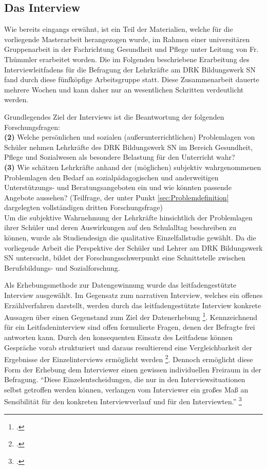 \subsection{Das Interview}
\label{sec:DasInterview}

Wie bereits eingangs erwähnt, ist ein Teil der Materialien, welche für die vorliegende Masterarbeit herangezogen wurde, im Rahmen einer universitären Gruppenarbeit in der Fachrichtung Gesundheit und Pflege unter Leitung von Fr. Thümmler erarbeitet worden. Die im Folgenden beschriebene Erarbeitung des Interviewleitfadens für die Befragung der Lehrkräfte am DRK Bildungswerk SN fand durch diese fünfköpfige Arbeitsgruppe statt. Diese Zusammenarbeit dauerte mehrere Wochen und kann daher nur an wesentlichen Schritten verdeutlicht werden.

\noindent
Grundlegendes Ziel der Interviews ist die Beantwortung der folgenden Forschungsfragen:\\

\noindent
\textbf{(2)} Welche persönlichen und sozialen (außerunterrichtlichen) Problemlagen von Schüler nehmen Lehrkräfte des DRK Bildungswerk SN im Bereich Gesundheit, Pflege und Sozialwesen als besondere Belastung für den Unterricht wahr?\\

\noindent
\textbf{(3)} Wie schätzen Lehrkräfte anhand der (möglichen) subjektiv wahrgenommenen Problemlagen den Bedarf an sozialpädagogischen und anderweitigen Unterstützungs- und Beratungsangeboten ein und wie könnten passende Angebote aussehen? (Teilfrage, der unter Punkt \ref{sec:Problemdefinition} dargelegten vollständigen dritten Forschungsfrage)\\

\noindent
Um die subjektive Wahrnehmung der Lehrkräfte hinsichtlich der Problemlagen ihrer Schüler und deren Auswirkungen auf den Schulalltag beschreiben zu können, wurde als Studiendesign die qualitative Einzelfallstudie gewählt. Da die vorliegende Arbeit die Perspektive der Schüler und Lehrer am DRK Bildungswerk SN untersucht, bildet der Forschungsschwerpunkt eine Schnittstelle zwischen Berufsbildungs- und Sozialforschung.

Als Erhebungsmethode zur Datengewinnung wurde das leitfadengestützte Interview ausgewählt. Im Gegensatz zum narrativen Interview, welches ein offenes Erzählverfahren darstellt, werden durch das leitfadengestützte Interview konkrete Aussagen über einen Gegenstand zum Ziel der Datenerhebung \footcite[vgl.][37]{Mayer2013}. Kennzeichnend für ein Leitfadeninterview sind offen formulierte Fragen, denen der Befragte frei antworten kann. Durch den konsequenten Einsatz des Leitfadens können Gespräche vorab strukturiert und daraus resultierend eine Vergleichbarkeit der Ergebnisse der Einzelinterviews ermöglicht werden \footcites[vgl.][112]{Flick1999}[vgl.][376f]{Friebertshaeuser1997}. Dennoch ermöglicht diese Form der Erhebung dem Interviewer einen gewissen individuellen Freiraum in der Befragung. "`Diese Einzelentscheidungen, die nur in den Interviewsituationen selbst getroffen werden können, verlangen vom Interviewer ein großes Maß an Sensibilität für den konkreten Interviewverlauf und für den Interviewten."' \footcite[113]{Flick1999} 

